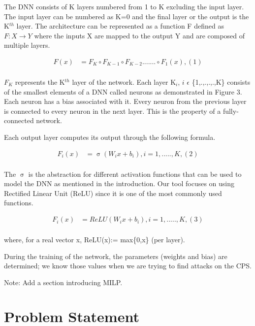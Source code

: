 The DNN consists of K layers numbered from 1 to K excluding the input layer.  The input layer can be numbered as K=0 and the final layer or the output is the K$^{th}$ layer.
The architecture can be represented as a function F defined as $F: X \rightarrow Y$ where the inputs X are mapped to the output Y and are composed of multiple layers. 

\begin{align*}
F(x) &= F_K \circ F_{K-1} \circ F_{K-2} ....... \circ F_1(x),    (1) \\
\end{align*}

$F_K$ represents the K$^{th}$ layer of the network. Each layer K$_{i}$, 
$i$ $\epsilon$ \{1,.,.,.,.,K\} consists of the smallest elements of a DNN called neurons as demonstrated in Figure 3.  Each neuron has a bias associated with it. Every neuron from the previous layer is connected to every neuron in the next layer. This is the property of a fully-connected network. 

Each output layer computes its output through the following formula. 

\begin{align*}
F_i(x) &= \upsigma(W_ix + b_i) ,  i = 1,.....,K, (2)  \\
\end{align*}

The $\upsigma$ is the abstraction for different activation functions that can be used to model the DNN as mentioned in the introduction. Our tool focuses on using Rectified Linear Unit (ReLU) since it is one of the most commonly used functions. %

\begin{align*}
F_i(x) &= ReLU(W_ix + b_i) ,  i = 1,.....,K , (3) \\
\end{align*}

where, for a real vector x, ReLU(x):= max\{0,x\} (per layer).

During the training of the network, the parameters (weights and bias) are determined; we know those values when we are trying to find attacks on the CPS.

Note: Add a section introducing MILP.

\section{Problem Statement}

